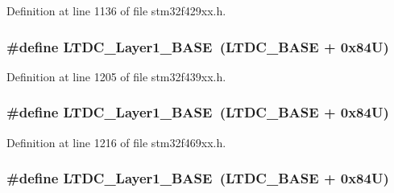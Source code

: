 Definition at line 1136 of file stm32f429xx.\+h.

\subsubsection[{\texorpdfstring{L\+T\+D\+C\+\_\+\+Layer1\+\_\+\+B\+A\+SE}{LTDC_Layer1_BASE}}]{\setlength{\rightskip}{0pt plus 5cm}\#define L\+T\+D\+C\+\_\+\+Layer1\+\_\+\+B\+A\+SE~({\bf L\+T\+D\+C\+\_\+\+B\+A\+SE} + 0x84\+U)}\hypertarget{group___peripheral__memory__map_ga81a2641d0a8e698f32b160b2d20d070b}{}\label{group___peripheral__memory__map_ga81a2641d0a8e698f32b160b2d20d070b}


Definition at line 1205 of file stm32f439xx.\+h.

\subsubsection[{\texorpdfstring{L\+T\+D\+C\+\_\+\+Layer1\+\_\+\+B\+A\+SE}{LTDC_Layer1_BASE}}]{\setlength{\rightskip}{0pt plus 5cm}\#define L\+T\+D\+C\+\_\+\+Layer1\+\_\+\+B\+A\+SE~({\bf L\+T\+D\+C\+\_\+\+B\+A\+SE} + 0x84\+U)}\hypertarget{group___peripheral__memory__map_ga81a2641d0a8e698f32b160b2d20d070b}{}\label{group___peripheral__memory__map_ga81a2641d0a8e698f32b160b2d20d070b}


Definition at line 1216 of file stm32f469xx.\+h.

\subsubsection[{\texorpdfstring{L\+T\+D\+C\+\_\+\+Layer1\+\_\+\+B\+A\+SE}{LTDC_Layer1_BASE}}]{\setlength{\rightskip}{0pt plus 5cm}\#define L\+T\+D\+C\+\_\+\+Layer1\+\_\+\+B\+A\+SE~({\bf L\+T\+D\+C\+\_\+\+B\+A\+SE} + 0x84\+U)}\hypertarget{group___peripheral__memory__map_ga81a2641d0a8e698f32b160b2d20d070b}{}\label{group___peripheral__memory__map_ga81a2641d0a8e698f32b160b2d20d070b}


